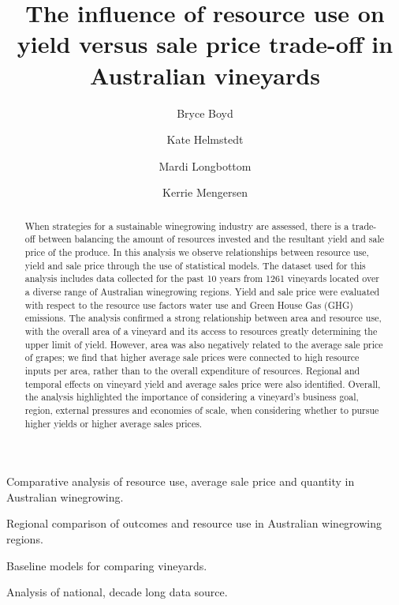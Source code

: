 \documentclass[review,12pt,authoryear]{elsarticle}
\begin{document}
\begin{frontmatter}

\title{The influence of resource use on yield versus sale price trade-off in Australian vineyards}

 \author[label1,label2,label3]{Bryce Boyd}
 \author[label1]{Kate Helmstedt}
 \author[label2]{Mardi Longbottom}
 \author[label1]{Kerrie Mengersen}

 \begin{highlights}
    \item Comparative analysis of resource use, average sale price and quantity in Australian winegrowing.
    \item Regional comparison of outcomes and resource use in Australian winegrowing regions.
    \item Baseline models for comparing vineyards.
    \item Analysis of national, decade long data source.
  \end{highlights}

 \begin{abstract}
    When strategies for a sustainable winegrowing industry are assessed, there is a trade-off between balancing the amount of resources invested and the resultant yield and sale price of the produce. In this analysis we observe relationships between resource use, yield and sale price through the use of statistical models. The dataset used for this analysis includes data collected for the past 10 years from 1261 vineyards located over a diverse range of Australian winegrowing regions. Yield and sale price were evaluated with respect to the resource use factors water use and Green House Gas (GHG) emissions. The analysis confirmed a strong relationship between area and resource use, with the overall area of a vineyard and its access to resources greatly determining the upper limit of yield. However, area was also negatively related to the average sale price of grapes; we find that higher average sale prices were connected to high resource inputs per area, rather than to the overall expenditure of resources. Regional and temporal effects on vineyard yield and average sales price were also identified. Overall, the analysis highlighted the importance of considering a vineyard's business goal, region, external pressures and economies of scale, when considering whether to pursue higher yields or higher average sales prices.
    \end{abstract}
    

\end{frontmatter}
\end{document}
